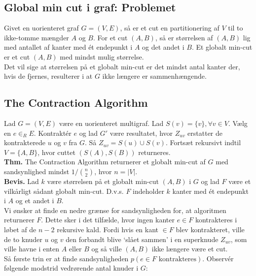 \documentclass[12pt]{article}
\begin{document}
\subsection*{Global min cut i graf: Problemet}

Givet en uorienteret graf $G=(V,E)$, så er et cut en partitionering af $V$ til to ikke-tomme mængder $A$ og $B$. For et cut $(A,B)$, så er størrelsen af $(A,B)$ lig med antallet af kanter med ét endepunkt i $A$ og det andet i $B$. Et globalt min-cut er et cut $(A,B)$ med mindst mulig størrelse. \\

Det vil sige at størrelsen på et globalt min-cut er det mindst antal kanter der, hvis de fjernes, resulterer i at $G$ ikke længere er sammenhængende. \\

\subsection*{The Contraction Algorithm}

Lad $G=(V,E)$ være en uorienteret multigraf. Lad $S(v)=\{v\}, \forall v \in V$. Vælg en $e \in_R E$. Kontraktér $e$ og lad $G'$ være resultatet, hvor $Z_{uv}$ erstatter de kontrakterede  $u$ og $v$ fra $G$. Så $Z_{uv}=S(u) \cup S(v)$. Fortsæt rekursivt indtil $V=\{A,B\}$, hvor cuttet $(S(A),S(B))$ returneres. \\

\textbf{Thm.} The Contraction Algorithm returnerer et globalt min-cut af $G$ med sandsynlighed mindst $1/\binom{n}{2}$, hvor $n=|V|$. \\

\textbf{Bevis.} Lad $k$ være størrelsen på et globalt min-cut $(A,B)$ i $G$ og lad $F$ være et vilkårligt sådant globalt min-cut. D.v.s. $F$ indeholder $k$ kanter med ét endepunkt i $A$ og et andet i $B$. \\

Vi ønsker at finde en nedre grænse for sandsynligheden for, at algoritmen returnerer $F$. Dette sker i det tilfælde, hvor ingen kanter $e \in F$ kontrakteres i løbet af de $n-2$ rekursive kald. Fordi hvis en kant $\in F$ blev kontrakteret, ville de to knuder $u$ og $v$ den forbandt blive `slået sammen' i en superknude $Z_{uv}$, som ville havne i enten $A$ eller $B$ og så ville $(A,B)$ ikke længere være et cut. \\

Så første trin er at finde sandsynligheden $p(e \in F \text{ kontrakteres})$. Observér følgende modstrid vedrørende antal knuder i $G$:
\end{document}
